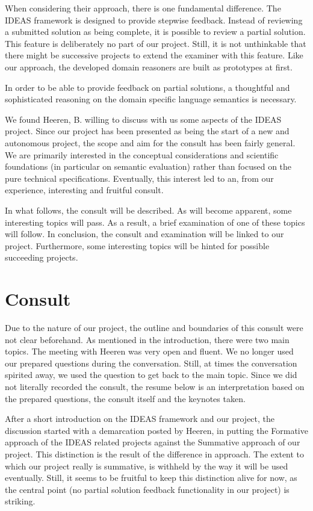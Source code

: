 When considering their approach, there is one fundamental difference. The IDEAS
framework is designed to provide stepwise feedback. Instead of reviewing a
submitted solution as being complete, it is possible to review a partial 
solution. This feature is deliberately no part of our project. Still, it is 
not unthinkable that there might be successive projects to extend the \gls{
examiner} with this feature. Like our approach, the developed domain reasoners 
are built as prototypes at first.


In order to be able to provide feedback on partial solutions, a thoughtful and 
sophisticated reasoning on the domain specific language semantics is 
necessary. 


We found Heeren, B. willing to discuss with us some aspects of the IDEAS 
project. Since our project has been presented as being the start of a new and 
autonomous project, the scope and aim for the consult has been fairly general. 
We are primarily interested in the conceptual considerations and scientific 
foundations (in particular on semantic evaluation) rather than focused on the 
pure technical specifications. Eventually, this interest led to an, from our 
experience, interesting and fruitful consult. 

In what follows, the consult will be described. As will become apparent, some 
interesting topics will pass. As a result, a brief examination of one of these 
topics will follow. In conclusion, the consult and examination will be linked 
to our project. Furthermore, some interesting topics will be hinted for 
possible succeeding projects.


\section{Consult}
Due to the nature of our project, the outline and boundaries of this consult 
were not clear beforehand. As mentioned in the introduction, there were two 
main topics. The meeting with Heeren was very open and fluent. We no longer 
used our prepared questions during the conversation. Still, at times the 
conversation spirited away, we used the question to get back to the main 
topic. Since we did not literally recorded the consult, the resume below is an 
interpretation based on the prepared questions, the consult itself and the 
keynotes taken.


After a short introduction on the IDEAS framework and our project, the 
discussion started with a demarcation posted by Heeren, in putting the 
Formative approach of the IDEAS related projects against the Summative 
approach of our project. This distinction is the result of the difference in 
approach. The extent to which our project really is summative, is withheld by 
the way it will be used eventually. Still, it seems to be fruitful to keep 
this distinction alive for now, as the central point (no partial solution 
feedback functionality in our project) is striking.


